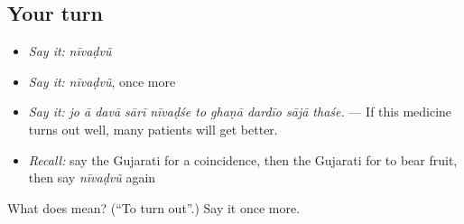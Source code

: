 \subsection*{Your turn}
\begin{itemize}
\raggedright
  \item \emph{Say it:} \emph{nīvaḍvũ}
  \item \emph{Say it:} \emph{nīvaḍvũ}, once more
  \item \emph{Say it:} \emph{jo ā davā sārī nīvaḍśe to ghaṇā dardīo sājā thaśe.} — If this medicine turns out well, many patients will get better.
  \item \emph{Recall:} say the Gujarati for a coincidence, then the Gujarati for to bear fruit, then say \emph{nīvaḍvũ} again
\end{itemize}

\begin{tcolorbox}[breakable,colback=teal!4,colframe=teal!35!black,title={Before you move on}]
What does  mean? (\textquotedblleft{}To turn out\textquotedblright{}.) Say it once more.
\end{tcolorbox}
